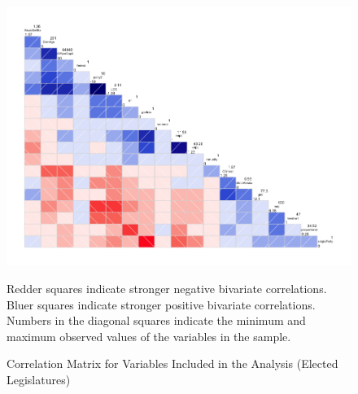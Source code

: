 \documentclass[a4paper]{article}\usepackage{graphicx, color}
\begin{document}
\begin{landscape}
\begin{figure}[t]
    \caption{Correlation Matrix for Variables Included in the Analysis (Elected Legislatures)}
    \label{corrmatrix}
    \begin{center}
    
    \includegraphics[width = \textwidth]{figure/corScatter.png}  






    \end{center}
    \begin{singlespace}
        {\scriptsize{Redder squares indicate stronger negative bivariate correlations. \\
        Bluer squares indicate stronger positive bivariate correlations. \\
        Numbers in the diagonal squares indicate the minimum and maximum observed values of the variables in the sample.
        }}
    \end{singlespace} 
\end{figure}
\end{landscape}

\end{document}
